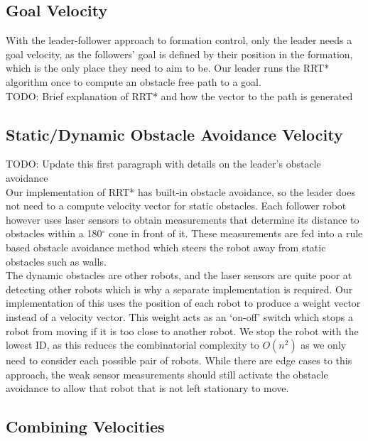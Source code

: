 \documentclass[letterpaper, 10 pt, conference]{ieeeconf}  %
\begin{document}
\subsection{Goal Velocity}

With the leader-follower approach to formation control, only the leader needs a goal velocity, as the followers' goal is defined by their position in the formation, which is the only place they need to aim to be. Our leader runs the RRT* algorithm once to compute an obstacle free path to a goal. \\

TODO: Brief explanation of RRT* and how the vector to the path is generated

\subsection{Static/Dynamic Obstacle Avoidance Velocity}

TODO: Update this first paragraph with details on the leader's obstacle avoidance \\

Our implementation of RRT* has built-in obstacle avoidance, so the leader does not need to a compute velocity vector for static obstacles. Each follower robot however uses laser sensors to obtain measurements that determine its distance to obstacles within a 180$^{\circ}$ cone in front of it. These measurements are fed into a rule based obstacle avoidance method which steers the robot away from static obstacles such as walls. \\

The dynamic obstacles are other robots, and the laser sensors are quite poor at detecting other robots which is why a separate implementation is required. Our implementation of this uses the position of each robot to produce a weight vector instead of a velocity vector. This weight acts as an `on-off' switch which stops a robot from moving if it is too close to another robot. We stop the robot with the lowest ID, as this reduces the combinatorial complexity to $O(n^{2})$ as we only need to consider each possible pair of robots. While there are edge cases to this approach, the weak sensor measurements should still activate the obstacle avoidance to allow that robot that is not left stationary to move.

\subsection{Combining Velocities}
\end{document}
